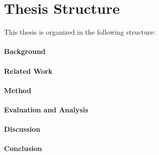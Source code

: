 \section*{Thesis Structure}
This thesis is organized in the following structure:\\\\
\textbf{Background}
\\\\
\textbf{Related Work}
\\\\
\textbf{Method}
\\\\
\textbf{Evaluation and Analysis}
\\\\
\textbf{Discussion}
\\\\
\textbf{Conclusion}